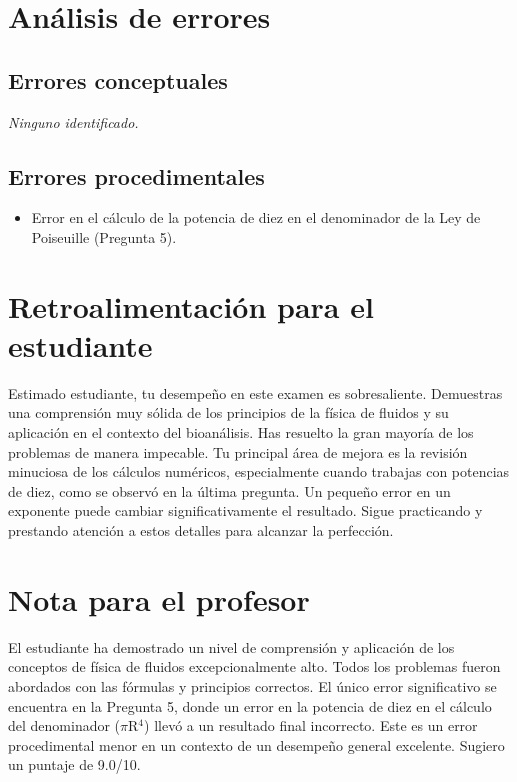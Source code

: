 \documentclass[11pt,a4paper]{article}
\begin{document}
\section*{Análisis de errores}

\subsection*{Errores conceptuales}
\textit{Ninguno identificado.}

\subsection*{Errores procedimentales}
\begin{itemize}[leftmargin=1.5em, itemsep=2pt]
  \item Error en el cálculo de la potencia de diez en el denominador de la Ley de Poiseuille (Pregunta 5).
\end{itemize}

\section*{Retroalimentación para el estudiante}
\begin{tcolorbox}[cajaRecomendacion, title={Dirigido a: maria malave 32585180}]
Estimado estudiante, tu desempeño en este examen es sobresaliente. Demuestras una comprensión muy sólida de los principios de la física de fluidos y su aplicación en el contexto del bioanálisis. Has resuelto la gran mayoría de los problemas de manera impecable. Tu principal área de mejora es la revisión minuciosa de los cálculos numéricos, especialmente cuando trabajas con potencias de diez, como se observó en la última pregunta. Un pequeño error en un exponente puede cambiar significativamente el resultado. Sigue practicando y prestando atención a estos detalles para alcanzar la perfección.
\end{tcolorbox}

\section*{Nota para el profesor}
\begin{tcolorbox}[
  enhanced, breakable,
  colback=yellow!8, colframe=yellow!60!black,
  fonttitle=\bfseries, coltitle=black,
  title={Observaciones para revisión manual},
  top=4pt, bottom=4pt, left=8pt, right=8pt,
]
El estudiante ha demostrado un nivel de comprensión y aplicación de los conceptos de física de fluidos excepcionalmente alto. Todos los problemas fueron abordados con las fórmulas y principios correctos. El único error significativo se encuentra en la Pregunta 5, donde un error en la potencia de diez en el cálculo del denominador ($\pi$R$^{4}$) llevó a un resultado final incorrecto. Este es un error procedimental menor en un contexto de un desempeño general excelente. Sugiero un puntaje de 9.0/10.
\end{tcolorbox}
\end{document}
